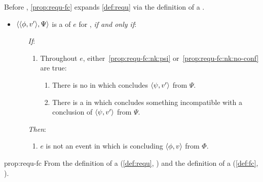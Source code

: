 \begin{note}
  Before , \autoref{prop:requ-fc} expands \autoref{def:requ} via the definition of a \fc{}.

  \begin{proposition}
    \label{prop:requ-fc}

    \begin{itemize}
    \item
      \(\langle \langle \phi, v' \rangle, \Psi \rangle\) is a \emph{\requ{}} of \(e\) for \vAgent{}, \emph{if and only if}:
      \begin{itemize}
      \item[\emph{If}:]
        \begin{enumerate}[label=\alph*., ref=(\alph*), series=requDefSeries]
        \item
          \label{prop:requ-fc:nk}
          Throughout \(e\), either~\ref{prop:requ-fc:nk:psi} or~\ref{prop:requ-fc:nk:no-conf} are true:
          \begin{enumerate}[label=\roman*., ref=(\roman*)]
          \item
            \label{prop:requ-fc:nk:psi}
            There is no \pevent{} in which \vAgent{} concludes \(\langle \psi, v' \rangle\) from \(\Psi\).
          \item
            \label{prop:requ-fc:nk:no-conf}
            There is a \pevent{} in which \vAgent{} concludes something incompatible with a conclusion of \(\langle \psi, v' \rangle\) from \(\Psi\).
          \end{enumerate}
        \end{enumerate}
      \item[\emph{Then}:]
        \begin{enumerate}[label=\alph*., ref=(\alph*), resume*=requDefSeries]
        \item
          \label{prop:requ-fc:ne}
          \(e\) is not an event in which \vAgent{} is concluding \(\langle \phi, v \rangle\) from \(\Phi\).
        \end{enumerate}
      \end{itemize}
    \end{itemize}
    \vspace{-\baselineskip}
  \end{proposition}

  \begin{argument}{prop:requ-fc}
    From the definition of a \requ{} (\autoref{def:requ}, ) and the definition of a \fc{} (\autoref{def:fc}, ).
  \end{argument}
\end{note}

